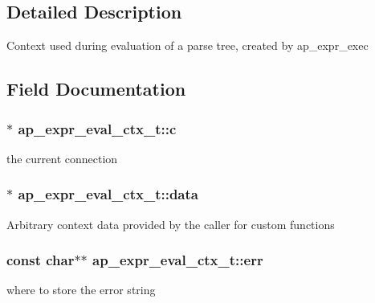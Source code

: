 \subsection{Detailed Description}
Context used during evaluation of a parse tree, created by ap\+\_\+expr\+\_\+exec 

\subsection{Field Documentation}
\subsubsection[{\texorpdfstring{c}{c}}]{$\ast$ ap\+\_\+expr\+\_\+eval\+\_\+ctx\+\_\+t\+::c}\hypertarget{structap__expr__eval__ctx__t_a6561f81a4258c997a2e7a2ce4e53d2b9}{}\label{structap__expr__eval__ctx__t_a6561f81a4258c997a2e7a2ce4e53d2b9}
the current connection 
\subsubsection[{\texorpdfstring{data}{data}}]{$\ast$ ap\+\_\+expr\+\_\+eval\+\_\+ctx\+\_\+t\+::data}\hypertarget{structap__expr__eval__ctx__t_af0b57d0d9335f30b2c6e09624b05e961}{}\label{structap__expr__eval__ctx__t_af0b57d0d9335f30b2c6e09624b05e961}
Arbitrary context data provided by the caller for custom functions 
\subsubsection[{\texorpdfstring{err}{err}}]{\setlength{\rightskip}{0pt plus 5cm}const char$\ast$$\ast$ ap\+\_\+expr\+\_\+eval\+\_\+ctx\+\_\+t\+::err}\hypertarget{structap__expr__eval__ctx__t_a336542556832ac0c0c2e025067328f87}{}\label{structap__expr__eval__ctx__t_a336542556832ac0c0c2e025067328f87}
where to store the error string 
